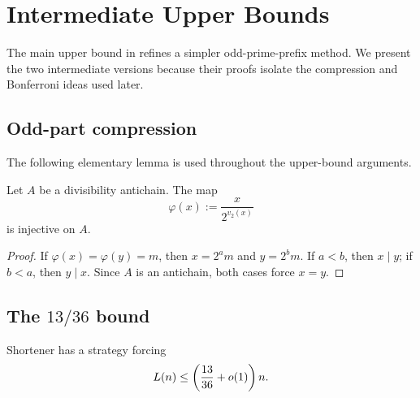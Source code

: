 \section{Intermediate Upper Bounds}\label{sec:intermediate}

The main upper bound in  refines a simpler
odd-prime-prefix method.  We present the two intermediate versions because
their proofs isolate the compression and Bonferroni ideas used later.

\subsection{Odd-part compression}

The following elementary lemma is used throughout the upper-bound arguments.

\begin{lemma}\label{lem:odd-part-injection}
Let $A$ be a divisibility antichain.  The map
\[
  \varphi(x):=\frac{x}{2^{v_2(x)}}
\]
is injective on $A$.
\end{lemma}

\begin{proof}
If $\varphi(x)=\varphi(y)=m$, then $x=2^a m$ and $y=2^b m$.  If $a<b$, then
$x\mid y$; if $b<a$, then $y\mid x$.  Since $A$ is an antichain, both cases
force $x=y$.
\end{proof}

\subsection{The \texorpdfstring{$13/36$}{13/36} bound}

\begin{theorem}\label{thm:thirteen-thirtysix}
Shortener has a strategy forcing
\[
  L(n)\le\left(\frac{13}{36}+o(1)\right)n.
\]
\end{theorem}

